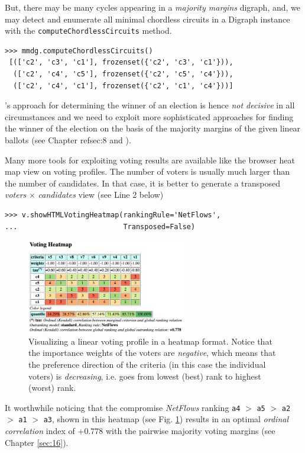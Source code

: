 But, there may be many cycles appearing in a \emph{majority margins} digraph, and, we may detect and enumerate all minimal chordless circuits in a Digraph instance with the \texttt{computeChordlessCircuits} method.
\begin{lstlisting}
>>> mmdg.computeChordlessCircuits()
 [(['c2', 'c3', 'c1'], frozenset({'c2', 'c3', 'c1'})), 
  (['c2', 'c4', 'c5'], frozenset({'c2', 'c5', 'c4'})), 
  (['c2', 'c4', 'c1'], frozenset({'c2', 'c1', 'c4'}))]
\end{lstlisting}

\Condorcet 's approach for determining the winner of an election is hence \emph{not decisive} in all circumstances and we need to exploit more sophisticated approaches for finding the winner of the election on the basis of the majority margins of the given linear ballots (see Chapter ref{sec:8} and \citet{BIS-2008a}). 

Many more tools for exploiting voting results are available like the browser heat map view on voting profiles. The number of voters is usually much larger than the number of candidates. In that case, it is better to generate a transposed \emph{voters} $\times$ \emph{candidates} view (see Line 2 below) 
\begin{lstlisting}
>>> v.showHTMLVotingHeatmap(rankingRule='NetFlows',
...                         Transposed=False)
\end{lstlisting}
\begin{figure}[h]
\sidecaption[t]
\includegraphics[width=7cm]{Figures/votingHeatmap.png}
\caption{Visualizing a linear voting profile in a heatmap format. Notice that the importance weights of the voters are \emph{negative}, which means that the preference direction of the criteria (in this case the individual voters) is \emph{decreasing}, i.e. goes from lowest (best) rank to highest (worst) rank.
}
\label{fig:7.3}       %
\end{figure}

It worthwhile noticing that the compromise \emph{NetFlows} ranking \texttt{a4} $>$ \texttt{a5} $>$ \texttt{a2} $>$ \texttt{a1} $>$ \texttt{a3}, shown in this heatmap (see Fig. \ref{fig:7.3}) results in an optimal \emph{ordinal correlation} index of $+0.778$ with the pairwise majority voting margins (see Chapter \ref{sec:16}). 

